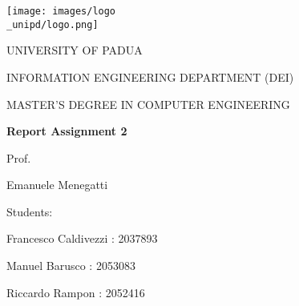 \begin{titlepage}
    \begin{center}
        \texttt{[image: images/logo\\\_unipd/logo.png]}
        
        \vspace*{1cm}
        \Large
        \textmd{UNIVERSITY OF PADUA}
        
        \vspace*{1cm}
        \large
        \textmd{INFORMATION ENGINEERING DEPARTMENT (DEI)}
                
        \vspace*{0.5cm}
        \large
        \textmd{MASTER'S DEGREE IN COMPUTER ENGINEERING} 
                
        \vspace*{1cm}
        \Huge
        \textbf{Report Assignment 2}
        
        
        \raggedright
        \vspace*{1cm}
        \large
        \textmd{Prof.}
        
        \textmd{Emanuele Menegatti}
        
        \raggedleft
        \vspace*{0.5cm}
        \large
        \textmd{Students:}
                
        \textmd{Francesco Caldivezzi : 2037893}       
        
        \textmd{Manuel Barusco : 2053083}        
        
        \textmd{Riccardo Rampon : 2052416}
        
    \end{center}
\end{titlepage}